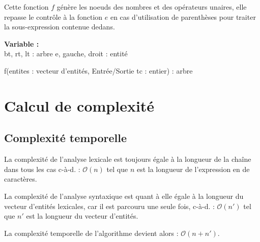\par
Cette fonction $f$ génère les noeuds des nombres et des opérateurs unaires, elle repasse le contrôle à la fonction $e$ en cas d'utilisation de parenthèses pour traiter la sous-expression contenue dedans.\\
\begin{function}[H]
    \textbf{Variable :}\\
    bt, rt, lt : arbre\;
    e, gauche, droit : entité\;
    \caption{f(entites : vecteur d'entités, Entrée/Sortie tc : entier) : arbre}
\end{function}

\section{Calcul de complexité}
\subsection{Complexité temporelle}
La complexité de l'analyse lexicale est toujours égale à la longueur de la chaîne dans tous les cas c-à-d. : $\mathcal{O}(n)$ tel que $n$ est la longueur de l'expression en de caractères.
\par
La complexité de l'analyse syntaxique est quant à elle égale à la longueur du vecteur d'entités lexicales, car il est parcouru une seule fois, c-à-d. : $\mathcal{O}(n')$ tel que $n'$ est la longueur du vecteur d'entités.
\par
La complexité temporelle de l'algorithme devient alors : $\mathcal{O}(n + n')$.

